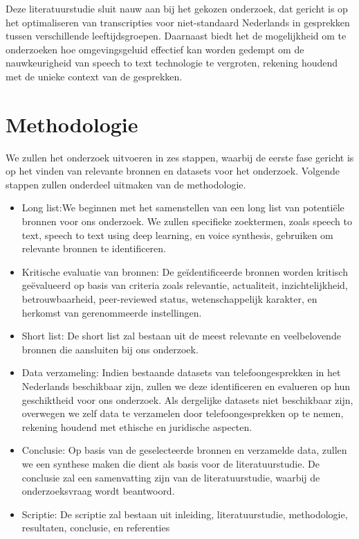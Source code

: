 Deze literatuurstudie sluit nauw aan bij het gekozen onderzoek, dat gericht is op het optimaliseren van transcripties voor niet-standaard Nederlands in gesprekken tussen verschillende leeftijdsgroepen. Daarnaast biedt het de mogelijkheid om te onderzoeken hoe omgevingsgeluid effectief kan worden gedempt om de nauwkeurigheid van speech to text technologie te vergroten, rekening houdend met de unieke context van de gesprekken.

\section{Methodologie}%
\label{sec:methodologie}

We zullen het onderzoek uitvoeren in zes stappen, waarbij de eerste fase gericht is op het vinden van relevante bronnen en datasets voor het onderzoek. Volgende stappen zullen onderdeel uitmaken van de methodologie.

\begin{itemize}
    \item Long list:We beginnen met het samenstellen van een long list van potentiële bronnen voor ons onderzoek. We zullen specifieke zoektermen, zoals speech to text, speech to text using deep learning, en voice synthesis, gebruiken om relevante bronnen te identificeren.
    \item Kritische evaluatie van bronnen: De geïdentificeerde bronnen worden kritisch geëvalueerd op basis van criteria zoals relevantie, actualiteit, inzichtelijkheid, betrouwbaarheid, peer-reviewed status, wetenschappelijk karakter, en herkomst van gerenommeerde instellingen.
    \item Short list: De short list zal bestaan uit de meest relevante en veelbelovende bronnen die aansluiten bij ons onderzoek.
    \item Data verzameling: Indien bestaande datasets van telefoongesprekken in het Nederlands beschikbaar zijn, zullen we deze identificeren en evalueren op hun geschiktheid voor ons onderzoek. Als dergelijke datasets niet beschikbaar zijn, overwegen we zelf data te verzamelen door telefoongesprekken op te nemen, rekening houdend met ethische en juridische aspecten.
    \item Conclusie: Op basis van de geselecteerde bronnen en verzamelde data, zullen we een synthese maken die dient als basis voor de literatuurstudie. De conclusie zal een samenvatting zijn van de literatuurstudie, waarbij de onderzoeksvraag wordt beantwoord.
    \item Scriptie: De scriptie zal bestaan uit inleiding, literatuurstudie, methodologie, resultaten, conclusie, en referenties
\end{itemize}

